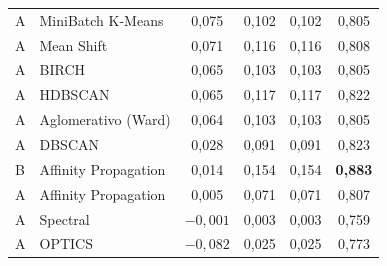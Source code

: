 \documentclass[12pt,a4paper]{article}
\begin{document}
\begin{table}[H]
\begin{tabular}{llcccc}
A & MiniBatch K-Means       & 0{,}075 & 0{,}102 & 0{,}102 & 0{,}805 \\
A & Mean Shift              & 0{,}071 & 0{,}116 & 0{,}116 & 0{,}808 \\
A & BIRCH                   & 0{,}065 & 0{,}103 & 0{,}103 & 0{,}805 \\
A & HDBSCAN                 & 0{,}065 & 0{,}117 & 0{,}117 & 0{,}822 \\
A & Aglomerativo (Ward)     & 0{,}064 & 0{,}103 & 0{,}103 & 0{,}805 \\
A & DBSCAN                  & 0{,}028 & 0{,}091 & 0{,}091 & 0{,}823 \\
B & Affinity Propagation    & 0{,}014 & 0{,}154 & 0{,}154 & \textbf{0{,}883} \\
A & Affinity Propagation    & 0{,}005 & 0{,}071 & 0{,}071 & 0{,}807 \\
A & Spectral                & $-0{,}001$ & 0{,}003 & 0{,}003 & 0{,}759 \\
A & OPTICS                  & $-0{,}082$ & 0{,}025 & 0{,}025 & 0{,}773 \\
\bottomrule
\end{tabular}
\end{table}
\end{document}
